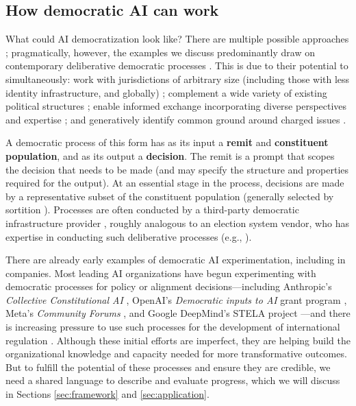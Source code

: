 \documentclass{article}
\begin{document}
\subsection{How democratic AI can work}

    What could AI democratization look like? There are multiple possible approaches \cite{seger2023, himmelreich2023against, cip2023whitepaper};
    pragmatically, however, the examples we discuss predominantly draw on contemporary deliberative democratic processes \cite{fishkin2011}. 
    This is due to their potential to simultaneously: work with jurisdictions of arbitrary size (including those with less identity infrastructure, and globally) \cite{oecd2020}
; complement a wide variety of existing political structures \cite{Fishkin_He_Luskin_Siu_2010}
    ; enable informed exchange incorporating diverse perspectives and expertise \cite{setala2010,landemore2012,dryzek2019,curato2021}
    ; and generatively identify common ground around charged issues \cite{ugarriza2014democratic}. 

    A democratic process of this form has as its input a \textbf{remit} and \textbf{constituent population}, and as its output a \textbf{decision}. The remit is a prompt that scopes the decision that needs to be made (and may specify the structure and properties required for the output). At an essential stage in the process, decisions are made by a representative subset of the constituent population (generally selected by sortition \cite{oecd2020}). Processes are often conducted by a third-party democratic infrastructure provider \cite{ovadya2023}, roughly analogous to an election system vendor, who has expertise in conducting such deliberative processes (e.g., \citet{involve2024,nexus2024,mosaic2024,mass-lbp2024}). 

    There are already early examples of democratic AI experimentation, including in companies. Most leading AI organizations have begun experimenting with democratic processes for policy or alignment decisions---including Anthropic's \textit{Collective Constitutional AI} \cite{anthropic2023}, OpenAI's \textit{Democratic inputs to AI} grant program \citep{eloundou2024}, Meta's \textit{Community Forums} \citep{broxmeyer2024}, and Google DeepMind's STELA project \citep{bergman2024}---and there is increasing pressure to use such processes for the development of international regulation \citep{connectedbydata2024,ovadya2023}. Although these initial efforts are imperfect, they are helping build the organizational knowledge and capacity needed for more transformative outcomes. But to fulfill the potential of these processes and ensure they are credible, we need a shared language to describe and evaluate progress, which we will discuss in Sections \ref{sec:framework} and \ref{sec:application}.
\end{document}
